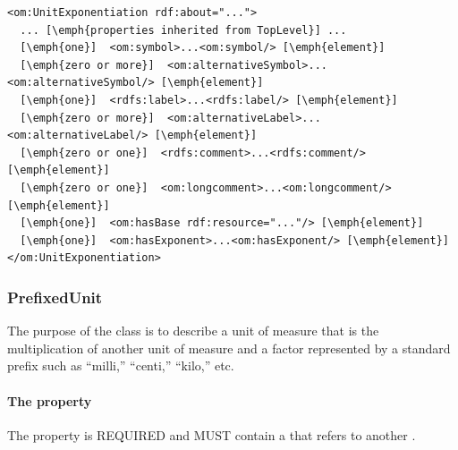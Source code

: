 \begin{lstlisting}
<om:UnitExponentiation rdf:about="...">
  ... [\emph{properties inherited from TopLevel}] ...
  [\emph{one}]  <om:symbol>...<om:symbol/> [\emph{element}]
  [\emph{zero or more}]  <om:alternativeSymbol>...<om:alternativeSymbol/> [\emph{element}]
  [\emph{one}]  <rdfs:label>...<rdfs:label/> [\emph{element}]
  [\emph{zero or more}]  <om:alternativeLabel>...<om:alternativeLabel/> [\emph{element}]
  [\emph{zero or one}]  <rdfs:comment>...<rdfs:comment/> [\emph{element}]
  [\emph{zero or one}]  <om:longcomment>...<om:longcomment/> [\emph{element}]
  [\emph{one}]  <om:hasBase rdf:resource="..."/> [\emph{element}]
  [\emph{one}]  <om:hasExponent>...<om:hasExponent/> [\emph{element}]
</om:UnitExponentiation>
\end{lstlisting}



\subsubsection{PrefixedUnit}
\label{sec:PrefixedUnit}

The purpose of the  class is to describe a unit of measure that is the multiplication of another unit of measure and a factor represented by a standard prefix such as ``milli,'' ``centi,'' ``kilo,'' etc. 

\paragraph{The  property}\label{sec:hasUnit:PrefixedUnit}
The  property is REQUIRED and MUST contain a  that refers to another . 

